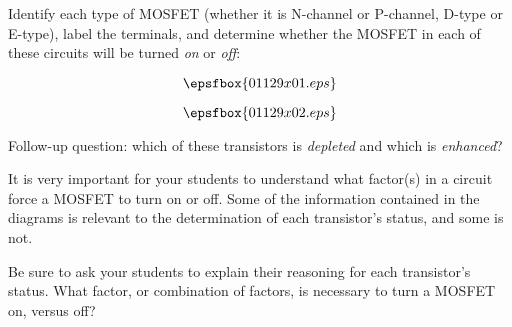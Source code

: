 

Identify each type of MOSFET (whether it is N-channel or P-channel, D-type or E-type), label the terminals, and determine whether the MOSFET in each of these circuits will be turned {\it on} or {\it off}:

$$\epsfbox{01129x01.eps}$$







$$\epsfbox{01129x02.eps}$$

\vskip 10pt

Follow-up question: which of these transistors is {\it depleted} and which is {\it enhanced}?







It is very important for your students to understand what factor(s) in a circuit force a MOSFET to turn on or off.  Some of the information contained in the diagrams is relevant to the determination of each transistor's status, and some is not.

Be sure to ask your students to explain their reasoning for each transistor's status.  What factor, or combination of factors, is necessary to turn a MOSFET on, versus off?




